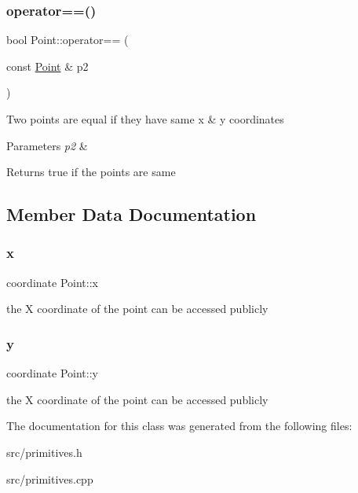 \subsubsection{\texorpdfstring{operator==()}{operator==()}}
{\footnotesize\ttfamily bool Point\+::operator== (\begin{DoxyParamCaption}\item[{const \hyperlink{classPoint}{Point} \&}]{p2 }\end{DoxyParamCaption})}

Two points are equal if they have same x \& y coordinates 
\begin{DoxyParams}{Parameters}
{\em p2} & \\
\hline
\end{DoxyParams}
\begin{DoxyReturn}{Returns}
true if the points are same 
\end{DoxyReturn}


\subsection{Member Data Documentation}
\mbox{\label{classPoint_a2e5bf2da8d7f35ef2ca707ae5ec1929b}} 
\subsubsection{\texorpdfstring{x}{x}}
{\footnotesize\ttfamily coordinate Point\+::x}

the X coordinate of the point can be accessed publicly \mbox{\label{classPoint_a4390d37c7ed19ad07212fc84df2fe26e}} 
\subsubsection{\texorpdfstring{y}{y}}
{\footnotesize\ttfamily coordinate Point\+::y}

the X coordinate of the point can be accessed publicly 

The documentation for this class was generated from the following files\+:\begin{DoxyCompactItemize}
\item 
src/primitives.\+h\item 
src/primitives.\+cpp\end{DoxyCompactItemize}
